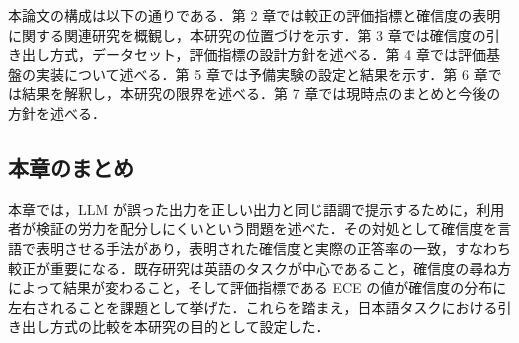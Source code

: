 本論文の構成は以下の通りである．第 2 章では較正の評価指標と確信度の表明に関する関連研究を概観し，本研究の位置づけを示す．第 3 章では確信度の引き出し方式，データセット，評価指標の設計方針を述べる．第 4 章では評価基盤の実装について述べる．第 5 章では予備実験の設定と結果を示す．第 6 章では結果を解釈し，本研究の限界を述べる．第 7 章では現時点のまとめと今後の方針を述べる．

\subsection{本章のまとめ}

本章では，LLM が誤った出力を正しい出力と同じ語調で提示するために，利用者が検証の労力を配分しにくいという問題を述べた．その対処として確信度を言語で表明させる手法があり，表明された確信度と実際の正答率の一致，すなわち較正が重要になる．既存研究は英語のタスクが中心であること，確信度の尋ね方によって結果が変わること，そして評価指標である ECE の値が確信度の分布に左右されることを課題として挙げた．これらを踏まえ，日本語タスクにおける引き出し方式の比較を本研究の目的として設定した．
